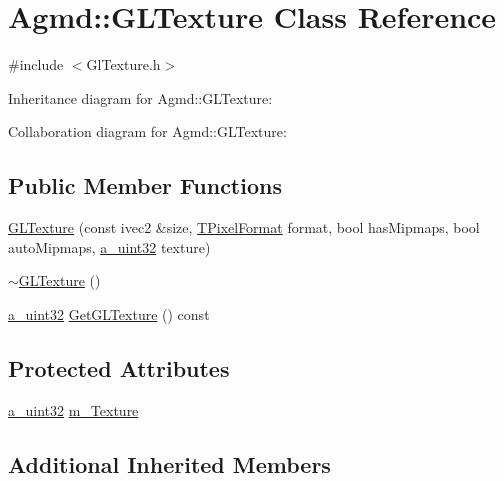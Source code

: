 \hypertarget{class_agmd_1_1_g_l_texture}{\section{Agmd\+:\+:G\+L\+Texture Class Reference}
\label{class_agmd_1_1_g_l_texture}
}


{\ttfamily \#include $<$Gl\+Texture.\+h$>$}



Inheritance diagram for Agmd\+:\+:G\+L\+Texture\+:


Collaboration diagram for Agmd\+:\+:G\+L\+Texture\+:
\subsection*{Public Member Functions}
\begin{DoxyCompactItemize}
\item 
\hyperlink{class_agmd_1_1_g_l_texture_a94fdd07831e2f2633a78d96e28d48456}{G\+L\+Texture} (const ivec2 \&size, \hyperlink{namespace_agmd_afc48fd9fa5dccb4c5621c052bfd1a7ec}{T\+Pixel\+Format} format, bool has\+Mipmaps, bool auto\+Mipmaps, \hyperlink{_common_defines_8h_a964296f9770051b9e4807b1f180dd416}{a\+\_\+uint32} texture)
\item 
\hyperlink{class_agmd_1_1_g_l_texture_a98f605b018e84cfc63628f10a5cd52f8}{$\sim$\+G\+L\+Texture} ()
\item 
\hyperlink{_common_defines_8h_a964296f9770051b9e4807b1f180dd416}{a\+\_\+uint32} \hyperlink{class_agmd_1_1_g_l_texture_a40df1851489961f3dc4cb8c957edf1ad}{Get\+G\+L\+Texture} () const 
\end{DoxyCompactItemize}
\subsection*{Protected Attributes}
\begin{DoxyCompactItemize}
\item 
\hyperlink{_common_defines_8h_a964296f9770051b9e4807b1f180dd416}{a\+\_\+uint32} \hyperlink{class_agmd_1_1_g_l_texture_af69c322f23124938ee25c929d0661f41}{m\+\_\+\+Texture}
\end{DoxyCompactItemize}
\subsection*{Additional Inherited Members}


